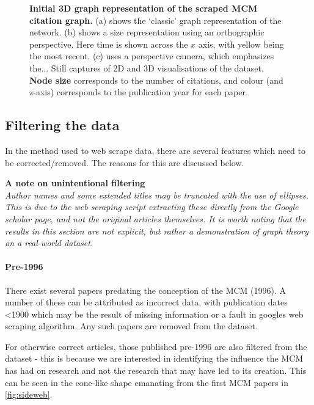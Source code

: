 \begin{figure}[H]
        \caption{ \textbf{Initial 3D graph representation of the scraped MCM citation graph.} (a) shows the `classic' graph representation of the network. (b) shows a size representation using an orthographic perspective. Here time is shown across the $x$ axis, with yellow being the most recent. (c)
        uses a perspective camera, which emphasizes the...
        Still captures of 2D and 3D visualisations of the dataset.\\ 
         \textbf{Node size} corresponds to the number of citations, and colour (and z-axis) corresponds to the publication year for each paper.}
        \label{fig:weball}

\end{figure}


\subsection{Filtering the data}\label{sec:filter3d}


In the method used to web scrape data, there are several features which need to be corrected/removed. The reasons for this are discussed below.
 
 
\textbf{A note on unintentional filtering}\\
\textit{
Author names and some extended titles may be truncated with the use of ellipses. This is due to the web scraping script extracting these directly from the Google scholar page, and not the original articles themselves. It is worth noting that the results in this section are not explicit, but rather a demonstration of graph theory on a real-world dataset.
}

 
\paragraph*{Pre-1996}
There exist several papers predating the conception of the MCM (1996). A number of these can be attributed as incorrect data, with publication dates <1900 which may be the result of missing information or a fault in googles web scraping algorithm. Any such papers are removed from the dataset.

 For otherwise correct articles, those published pre-1996 are also filtered from the dataset - this is because we are interested in identifying the influence the MCM has had on research and not the research that may have led to its creation. This can be seen in the cone-like shape emanating from the first MCM papers in \autoref{fig:sideweb}.

